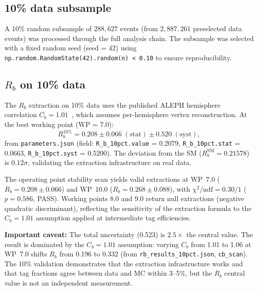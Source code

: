 \documentclass[11pt,a4paper]{article}
\begin{document}
\subsection{10\% data subsample}
\label{sec:subsample_10pct}

A 10\% random subsample of $288{,}627$ events (from $2{,}887{,}261$ preselected data events)
was processed through the full analysis chain. The subsample was selected with a fixed
random seed (seed = 42) using \texttt{np.random.RandomState(42).random(n) < 0.10} to ensure
reproducibility.

\subsection{$R_b$ on 10\% data}
\label{sec:result_rb_10pct}

The $R_b$ extraction on 10\% data uses the published ALEPH hemisphere correlation
$C_b = 1.01$~\cite{ALEPH:Rb:1996}, which assumes per-hemisphere vertex reconstruction.
At the best working point (WP = 7.0):
\begin{equation}
R_b^{10\%} = 0.208 \pm 0.066\;\mathrm{(stat)} \pm 0.520\;\mathrm{(syst)},
\label{eq:rb_10pct}
\end{equation}
from \texttt{parameters.json} (field: \texttt{R\_b\_10pct.value} = 0.2079,
\texttt{R\_b\_10pct.stat} = 0.0663, \texttt{R\_b\_10pct.syst} = 0.5200).
The deviation from the SM ($R_b^\mathrm{SM} = 0.21578$) is $0.12\sigma$, validating
the extraction infrastructure on real data.

The operating point stability scan yields valid extractions at WP~7.0
($R_b = 0.208 \pm 0.066$) and WP~10.0 ($R_b = 0.268 \pm 0.088$), with
$\chi^2/\mathrm{ndf} = 0.30/1$ ($p = 0.586$, PASS). Working points 8.0 and 9.0
return null extractions (negative quadratic discriminant), reflecting the sensitivity
of the extraction formula to the $C_b = 1.01$ assumption applied at intermediate
tag efficiencies.

\textbf{Important caveat:} The total uncertainty (0.523) is $2.5\times$ the central value.
The result is dominated by the $C_b = 1.01$ assumption: varying $C_b$ from 1.01 to 1.06
at WP~7.0 shifts $R_b$ from 0.196 to 0.332 (from \texttt{rb\_results\_10pct.json},
\texttt{cb\_scan}). The 10\% validation demonstrates that the extraction infrastructure
works and that tag fractions agree between data and MC within 3--5\%, but the $R_b$
central value is not an independent measurement.
\end{document}
